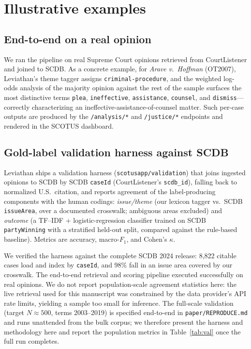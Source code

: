 \documentclass[preprint,12pt]{elsarticle}
\begin{document}
\section{Illustrative examples}

\subsection{End-to-end on a real opinion}
We ran the pipeline on real Supreme Court opinions retrieved from CourtListener and joined to SCDB.
As a concrete example, for \emph{Arave v.\ Hoffman} (OT2007), Leviathan's theme tagger assigns
\texttt{criminal-procedure}, and the weighted log-odds analysis of the majority opinion against the
rest of the sample surfaces the most distinctive terms \texttt{plea}, \texttt{ineffective},
\texttt{assistance}, \texttt{counsel}, and \texttt{dismiss}---correctly characterizing an
ineffective-assistance-of-counsel matter. Such per-case outputs are produced by the
\texttt{/analysis/*} and \texttt{/justice/*} endpoints and rendered in the SCOTUS dashboard.

\subsection{Gold-label validation harness against SCDB}
\label{sec:validation}
Leviathan ships a validation harness (\texttt{scotusapp/validation}) that joins ingested opinions to
SCDB \cite{spaeth2023scdb} by SCDB \texttt{caseId} (CourtListener's \texttt{scdb\_id}), falling back
to normalized U.S.\ citation, and reports agreement of the label-producing components with the human
codings: \emph{issue/theme} (our lexicon tagger vs.\ SCDB \texttt{issueArea}, over a documented
crosswalk; ambiguous areas excluded) and \emph{outcome} (a TF--IDF + logistic-regression classifier
trained on SCDB \texttt{partyWinning} with a stratified held-out split, compared against the
rule-based baseline). Metrics are accuracy, macro-$F_1$, and Cohen's $\kappa$.

We verified the harness against the complete SCDB 2024 release: 8{,}822 citable cases load and index
by \texttt{caseId}, and 98\% fall in an issue area covered by our crosswalk. The end-to-end retrieval
and scoring pipeline executed successfully on real opinions. We do not report population-scale
agreement statistics here: the live retrieval used for this manuscript was constrained by the data
provider's API rate limits, yielding a sample too small for inference. The full-scale validation
(target $N\!\approx\!500$, terms 2003--2019) is specified end-to-end in \texttt{paper/REPRODUCE.md}
and runs unattended from the bulk corpus; we therefore present the harness and methodology here and
report the population metrics in Table~\ref{tab:val} once the full run completes.
\end{document}
